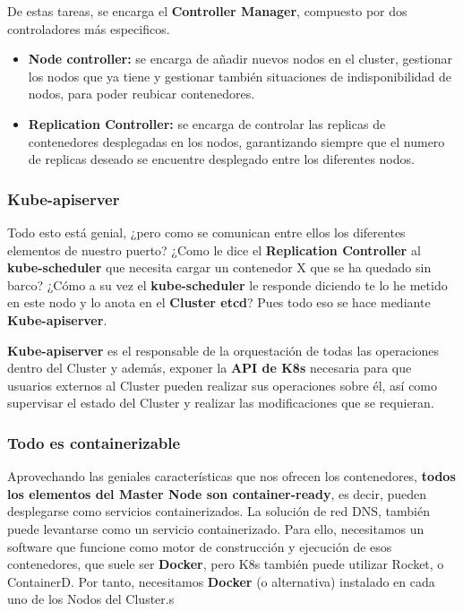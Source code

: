 \documentclass{article}
\begin{document}
De estas tareas, se encarga el \textbf{Controller Manager}, compuesto por dos controladores más especificos.

\begin{itemize}
    \item \textbf{Node controller:} se encarga de añadir nuevos nodos en el cluster, gestionar los nodos que ya tiene y gestionar también situaciones de indisponibilidad de nodos, para poder reubicar contenedores.
    
    \item \textbf{Replication Controller:} se encarga de controlar las replicas de contenedores desplegadas en los nodos, garantizando siempre que el numero de replicas deseado se encuentre desplegado entre los diferentes nodos.
\end{itemize}

\subsubsection{Kube-apiserver}

Todo esto está genial, ¿pero como se comunican entre ellos los diferentes elementos de nuestro puerto? ¿Como le dice el \textbf{Replication Controller} al \textbf{kube-scheduler} que necesita cargar un contenedor X que se ha quedado sin barco? ¿Cómo a su vez el \textbf{kube-scheduler} le responde diciendo te lo he metido en este nodo y lo anota en el \textbf{Cluster etcd}? Pues todo eso se hace mediante \textbf{Kube-apiserver}.

\textbf{Kube-apiserver} es el responsable de la orquestación de todas las operaciones dentro del Cluster y además, exponer la \textbf{API de K8s} necesaria para que usuarios externos al Cluster pueden realizar sus operaciones sobre él, así como supervisar el estado del Cluster y realizar las modificaciones que se requieran.

\subsubsection{Todo es containerizable}

Aprovechando las geniales características que nos ofrecen los contenedores, \textbf{todos los elementos del Master Node son container-ready}, es decir, pueden desplegarse como servicios containerizados. La solución de red DNS, también puede levantarse como un servicio containerizado. Para ello, necesitamos un software que funcione como motor de construcción y ejecución de esos contenedores, que suele ser \textbf{Docker}, pero K8s también puede utilizar Rocket, o ContainerD. Por tanto, necesitamos \textbf{Docker} (o alternativa) instalado en cada uno de los Nodos del Cluster.s
\end{document}
